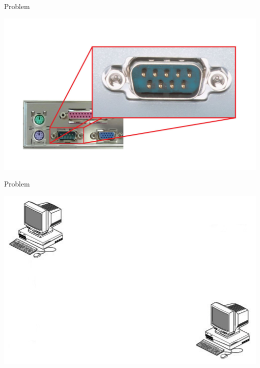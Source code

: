 \documentclass[beamer]{uibk}
\begin{document}
\begin{frame}{Problem}
  \begin{center}
  \includegraphics[width=\textwidth,height=\textheight,keepaspectratio]{serial.jpg}
  \end{center}
\end{frame}


\begin{frame}{Problem}
  \begin{center}
  \includegraphics[width=\textwidth,height=\textheight,keepaspectratio]{ansatz_1.jpg}
  \end{center}
\end{frame}
\end{document}
